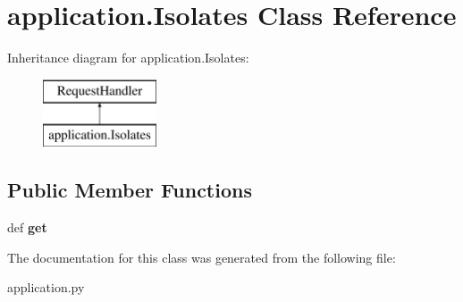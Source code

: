 \hypertarget{classapplication_1_1_isolates}{\section{application.\-Isolates Class Reference}
\label{classapplication_1_1_isolates}
}
Inheritance diagram for application.\-Isolates\-:\begin{figure}[H]
\begin{center}
\leavevmode
\includegraphics[height=2.000000cm]{classapplication_1_1_isolates}
\end{center}
\end{figure}
\subsection*{Public Member Functions}
\begin{DoxyCompactItemize}
\item 
\hypertarget{classapplication_1_1_isolates_ad771bde1f560d14e70fe9e970bd491d3}{def {\bfseries get}}\label{classapplication_1_1_isolates_ad771bde1f560d14e70fe9e970bd491d3}

\end{DoxyCompactItemize}


The documentation for this class was generated from the following file\-:\begin{DoxyCompactItemize}
\item 
application.\-py\end{DoxyCompactItemize}

